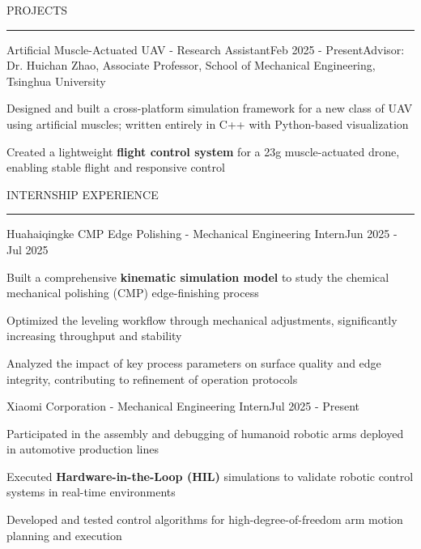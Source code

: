 \documentclass{resume} %
\renewenvironment{rSection}[1]{
\sectionskip
\textcolor{TsinghuaPurple}{\MakeUppercase{#1}}
\sectionlineskip
\hrule
\begin{list}{}{
\setlength{\leftmargin}{0em}
}
\item[]
}{
\end{list}
}
\begin{document}
\begin{rSection}{PROJECTS}
    \begin{rSubsection}{Artificial Muscle-Actuated UAV - Research Assistant}{Feb 2025 - Present}{Advisor: Dr. Huichan Zhao, Associate Professor, School of Mechanical Engineering, Tsinghua University}{}
    \item Designed and built a cross-platform simulation framework for a new class of UAV using artificial muscles; written entirely in C++ with Python-based visualization
    \item Created a lightweight \textbf{flight control system} for a 23g muscle-actuated drone, enabling stable flight and responsive control
    \end{rSubsection}
    
    \end{rSection}
    
\begin{rSection}{Internship Experience}

    \begin{rSubsection}{Huahaiqingke CMP Edge Polishing - Mechanical Engineering Intern}{Jun 2025 - Jul 2025}{}{}
    \item Built a comprehensive \textbf{kinematic simulation model} to study the chemical mechanical polishing (CMP) edge-finishing process
    \item Optimized the leveling workflow through mechanical adjustments, significantly increasing throughput and stability
    \item Analyzed the impact of key process parameters on surface quality and edge integrity, contributing to refinement of operation protocols
    \end{rSubsection}
    
    \begin{rSubsection}{Xiaomi Corporation - Mechanical Engineering Intern}{Jul 2025 - Present}{}{}
    \item Participated in the assembly and debugging of humanoid robotic arms deployed in automotive production lines
    \item Executed \textbf{Hardware-in-the-Loop (HIL)} simulations to validate robotic control systems in real-time environments
    \item Developed and tested control algorithms for high-degree-of-freedom arm motion planning and execution
    \end{rSubsection}
    
    \end{rSection}    
\end{document}
